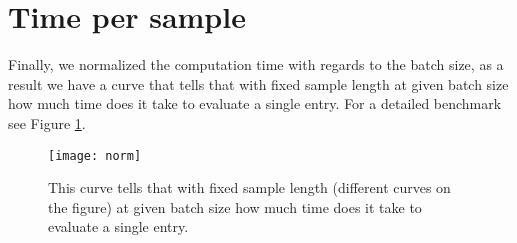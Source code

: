\section{Time per sample}
Finally, we normalized the computation time with regards to the batch size, as a result we have a curve that tells that with fixed sample length at given batch size how much time does it take to evaluate a single entry. For a detailed benchmark see Figure \ref{fig:norm}.

\begin{figure}
  \texttt{[image: norm]}
  \caption{This curve tells that with fixed sample length (different curves on the figure) at given batch size how much time does it take to evaluate a single entry.}
  \label{fig:norm}
\end{figure}
